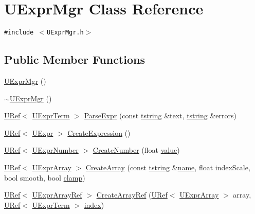 \hypertarget{class_u_expr_mgr}{
\section{UExprMgr Class Reference}
\label{class_u_expr_mgr}
}
{\tt \#include $<$UExprMgr.h$>$}

\subsection*{Public Member Functions}
\begin{CompactItemize}
\item 
\hyperlink{class_u_expr_mgr_b24ea40407f2cb207a97045051c7a10a}{UExprMgr} ()
\item 
\hyperlink{class_u_expr_mgr_30657d4463c40f1d5f09377274b9f9dd}{$\sim$UExprMgr} ()
\item 
\hyperlink{class_u_ref}{URef}$<$ \hyperlink{class_u_expr_term}{UExprTerm} $>$ \hyperlink{class_u_expr_mgr_a6d17d391282f2b68c8ce92af1d0b204}{ParseExpr} (const \hyperlink{common__afx_8h_816fa58fd77499b0edb2c69ebe803d5c}{tstring} \&text, \hyperlink{common__afx_8h_816fa58fd77499b0edb2c69ebe803d5c}{tstring} \&errors)
\item 
\hyperlink{class_u_ref}{URef}$<$ \hyperlink{class_u_expr}{UExpr} $>$ \hyperlink{class_u_expr_mgr_1fe471416a27b2dda3856c14137b3880}{CreateExpression} ()
\item 
\hyperlink{class_u_ref}{URef}$<$ \hyperlink{class_u_expr_number}{UExprNumber} $>$ \hyperlink{class_u_expr_mgr_a69ed663f2ce4467182f40877cff51fe}{CreateNumber} (float \hyperlink{glext__bak_8h_6a4f8a1a444e9080b297963b3db29fe0}{value})
\item 
\hyperlink{class_u_ref}{URef}$<$ \hyperlink{class_u_expr_array}{UExprArray} $>$ \hyperlink{class_u_expr_mgr_18db87e4cabfcff47d49d313d080ed44}{CreateArray} (const \hyperlink{common__afx_8h_816fa58fd77499b0edb2c69ebe803d5c}{tstring} \&\hyperlink{glext__bak_8h_bb62efe59ccdd153ce42e1a418352209}{name}, float indexScale, bool smooth, bool \hyperlink{glext_8h_3878d3005eeb2d2ef414abc752ba3c9b}{clamp})
\item 
\hyperlink{class_u_ref}{URef}$<$ \hyperlink{class_u_expr_array_ref}{UExprArrayRef} $>$ \hyperlink{class_u_expr_mgr_fa2c22981d73f120ee52777ecc34a8ed}{CreateArrayRef} (\hyperlink{class_u_ref}{URef}$<$ \hyperlink{class_u_expr_array}{UExprArray} $>$ array, \hyperlink{class_u_ref}{URef}$<$ \hyperlink{class_u_expr_term}{UExprTerm} $>$ \hyperlink{glext__bak_8h_57f14e05b1900f16a2da82ade47d0c6d}{index})
\item 

\end{CompactItemize}
